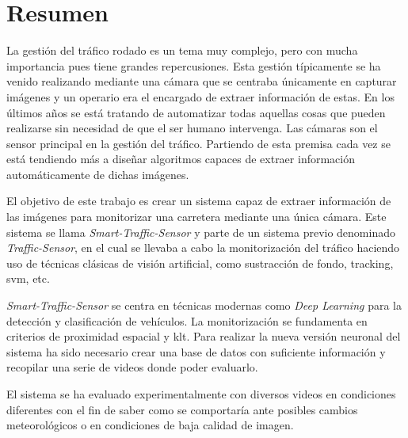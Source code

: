\chapter*{Resumen}

La gestión del tráfico rodado es un tema muy complejo, pero con mucha importancia pues tiene grandes repercusiones. Esta gestión típicamente se ha venido realizando mediante una cámara que se centraba únicamente en capturar imágenes y un operario era el encargado de extraer información de estas. En los últimos años se está tratando de automatizar todas aquellas cosas que pueden realizarse sin necesidad de que el ser humano intervenga. Las cámaras son el sensor principal en la gestión del tráfico. Partiendo de esta premisa cada  vez se está tendiendo más a diseñar algoritmos capaces de extraer información automáticamente de dichas imágenes.

El objetivo de este trabajo es crear un sistema capaz de extraer información de las imágenes para monitorizar una carretera mediante una única cámara. Este sistema se llama \textit{Smart-Traffic-Sensor} y parte de un sistema previo denominado \textit{Traffic-Sensor}, en el cual se llevaba a cabo la monitorización del tráfico haciendo uso de técnicas clásicas de visión artificial, como sustracción de fondo, tracking, \acrshort{svm}, etc.

\textit{Smart-Traffic-Sensor} se centra en técnicas modernas como \textit{Deep Learning} para la detección y clasificación de vehículos. La monitorización se fundamenta en criterios  de  proximidad  espacial  y \acrfull{klt}. Para realizar la nueva versión neuronal del sistema ha sido necesario crear una base de datos con suficiente información y recopilar una serie de videos donde poder evaluarlo.

El sistema se ha evaluado experimentalmente con diversos videos en condiciones diferentes con el fin de saber como se comportaría ante posibles cambios meteorológicos o en condiciones de baja calidad de imagen.




